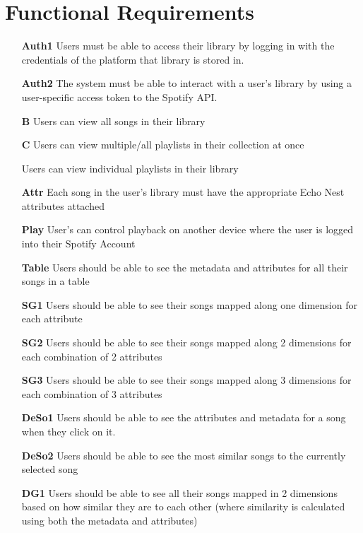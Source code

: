 \section{Functional Requirements}
\begin{itemize}
    \item[\textbf{Auth1}] Users must be able to access their library by logging in with the credentials of the platform that library is stored in.
    \item[\textbf{Auth2}] The system must be able to interact with a user's library by using a user-specific access token to the Spotify API.
    \item[\textbf{B}] Users can view all songs in their library
    \item[\textbf{C}] Users can view multiple/all playlists in their collection at once
    \item[] Users can view individual playlists in their library
    \item[\textbf{Attr}] Each song in the user's library must have the appropriate Echo Nest attributes attached
    \item[\textbf{Play}] User's can control playback on another device where the user is logged into their Spotify Account
    \item[\textbf{Table}] Users should be able to see the metadata and attributes for all their songs in a table
    \item[\textbf{SG1}] Users should be able to see their songs mapped along one dimension for each attribute
    \item[\textbf{SG2}] Users should be able to see their songs mapped along 2 dimensions for each combination of 2 attributes
    \item[\textbf{SG3}] Users should be able to see their songs mapped along 3 dimensions for each combination of 3 attributes
    \item[\textbf{DeSo1}] Users should be able to see the attributes and metadata for a song when they click on it.
    \item[\textbf{DeSo2}] Users should be able to see the most similar songs to the currently selected song
    \item[\textbf{DG1}] Users should be able to see all their songs mapped in 2 dimensions based on how similar they are to each other (where similarity is calculated using both the metadata and attributes)

\end{itemize}

